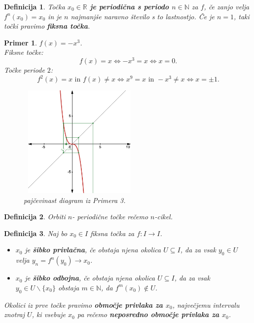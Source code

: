 \documentclass{article}
\newtheorem{definicija}{Definicija}
\newtheorem{primer}{Primer}
\newcommand{\N}{\mathbb{N}}
\newcommand{\R}{\mathbb{R}}
\begin{document}
\begin{definicija}
Točka \textbf{$x_0 \in \R$ je periodična s periodo $n\in \N$} za $f$, če zanjo velja $f^n(x_0) = x_0$ in je $n$ najmanjše naravno število s to lastnostjo. Če je $n=1$, taki točki pravimo \textbf{fiksna točka}.
\end{definicija}

\begin{primer}
$f(x) = -x^3$. \\ 
Fiksne točke: 
$$f(x) = x \iff -x^3 = x \iff x = 0.$$ 
Točke periode $2$: $$f^2(x) = x \text{ in } f(x) \neq x \iff x^9 = x \text{ in } -x^3 \neq x\iff x = \pm 1.$$


\begin{figure}[h!]
    \center
        \includegraphics[width=6cm, height=5.5cm]{Grafi/cobweb3.png}
        \caption{pajčevinast diagram iz Primera 3.}
    \end{figure}    
\end{primer}

\begin{definicija}
Orbiti $n$- periodične točke rečemo $n$-cikel.
\end{definicija}

\newpage
\begin{definicija}
Naj bo $x_0 \in I$ fiksna točka za $f:I \rightarrow I$.
\begin{itemize}
\item $x_0$ je \textbf{šibko privlačna}, če obstaja njena okolica $U\subseteq I$, da za vsak $y_0 \in U$ velja $y_n = f^n(y_0) \rightarrow x_0$.
\item $x_0$ je \textbf{šibko odbojna}, če obstaja njena okolica $U\subseteq I$, da za vsak $y_0 \in U\backslash\{x_0\}$ obstaja $m\in \N$, da $f^m(x_0) \not\in U$.
\end{itemize}
Okolici iz prve točke pravimo \textbf{območje privlaka za $x_0$}, največjemu intervalu znotraj $U$, ki vsebuje $x_0$ pa rečemo \textbf{neposredno območje privlaka za $x_0$}.\\ 
\end{definicija}
\end{document}
